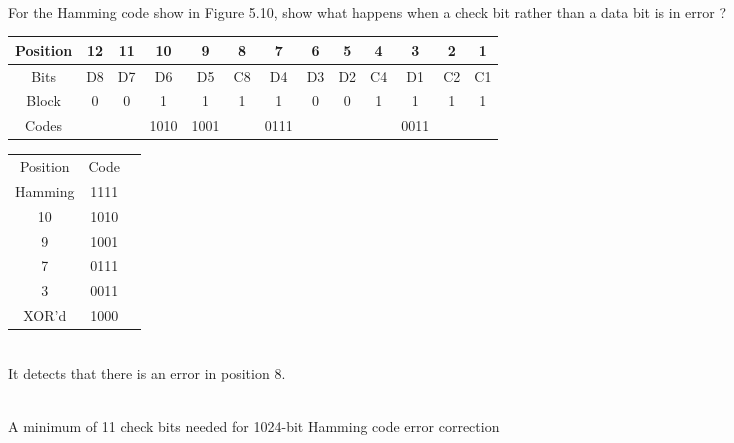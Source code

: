 \documentclass[12pt,largemargins]{homework}
\date{Septemeber 6, 2018}
\begin{document}
\maketitle
{}\\
For the Hamming code show in Figure 5.10, show what happens when a check bit rather than a data bit is in error ?\\
\begin{center}
	\begin{tabular}{|c|c|c|c|c|c|c|c|c|c|c|c|c|}
		\hline
		Position & 12 & 11 & 10 & 9 & 8 & 7 & 6 & 5 & 4 & 3 & 2 & 1\\
		\hline 
		Bits  & D8  & D7 & D6 & D5 & C8 & D4 & D3 & D2 & C4 & D1 & C2 & C1\\
		\hline
		Block  & 0 & 0 & 1 & 1 & 1 & 1 & 0 & 0 & 1 & 1 & 1 & 1\\
		\hline
		Codes  & & & 1010 & 1001  &  & 0111 & & & & 0011 & & \\
		\hline 
	\end{tabular}
	
	\begin{tabular}{|c|c|c|}
		\hline
		Position & Code\\
		Hamming & 1111\\
		10 & 1010\\
		9 & 1001\\
		7 & 0111\\
		3 & 0011\\
		XOR'd & 1000\\
		\hline
	\end{tabular}\\
	It detects that there is an error in position 8.\\
\end{center}
\\
A minimum of 11 check bits needed for 1024-bit Hamming code error correction
\end{document}
